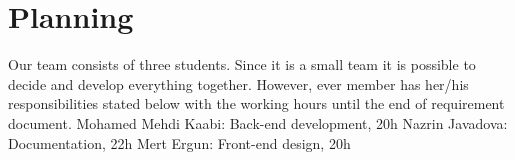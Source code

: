 \newpage
\section{Planning}
\quad Our team consists of three students. Since it is a small team it is possible to decide and develop everything together. However, ever member has her/his responsibilities stated below with the working hours until the end of requirement document.\newline
\newline
Mohamed Mehdi Kaabi: Back-end development, 20h\newline
Nazrin Javadova: Documentation, 22h\newline
Mert Ergun: Front-end design, 20h
